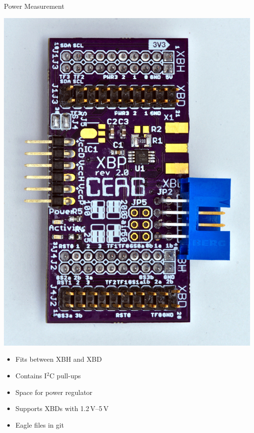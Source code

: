 \documentclass[xcolor=pdftex,dvipsnames,table,final]{beamer}
\begin{document}
\begin{frame}[fragile]{}
\begin{columns}[t]
\begin{column}{.31\linewidth}
       \begin{block}{Power Measurement}
        \begin{minipage}{0.69\linewidth}
		\includegraphics[scale=1.5]{../figures/xbp-full-top90}
        \end{minipage}
	\hspace{-5ex}
	\begin{minipage}{0.31\linewidth}
          \begin{itemize}
            \item Fits between XBH and XBD
            \item Contains I$^2$C pull-ups
            \item Space for power regulator
            \item Supports XBDs with 1.2\,V--5\,V
            \item Eagle files in git
          \end{itemize}

\end{minipage}
\end{block}
\end{column}
\end{columns}
\end{frame}
\end{document}
